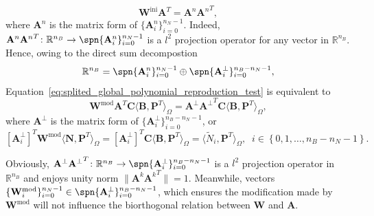 \begin{equation}
	\mathbf{W}^\text{ini}\mathbf{A}^T=\mathbf{A}^n{\mathbf{A}^n}^T,
\end{equation}
where $\mathbf{A}^n$ is the matrix form of $\{\mathbf{A}^n_i\}_{i=0}^{n_N-1}$. Indeed, $\mathbf{A}^n{\mathbf{A}^n}^T\colon\mathbb{R}^{n_B}\rightarrow\spn\{\mathbf{A}^n_i\}_{i=0}^{n_N-1}$ is a $l^2$ projection operator for any vector in $\mathbb{R}^{n_B}$. Hence, owing to the direct sum decompostion
\begin{equation}
	\mathbb{R}^{n_B}=\spn\{\mathbf{A}^n_i\}_{i=0}^{n_N-1}\oplus\spn\{\mathbf{A}^\perp_i\}_{i=0}^{n_B-n_N-1},
\end{equation}
Equation~\eqref{eq:splited_global_polynomial_reproduction_test} is equivalent to
\begin{equation}
	\mathbf{W}^\text{mod}\mathbf{A}^T\mathbf{C}\langle\mathbf{B},\mathbf{P}^T\rangle_\Omega=\mathbf{A}^\perp{\mathbf{A}^\perp}^T\mathbf{C}\langle\mathbf{B},\mathbf{P}^T\rangle_\Omega,
\end{equation}
where $\mathbf{A}^\perp$ is the matrix form of $\{\mathbf{A}^\perp_i\}_{i=0}^{n_B-n_N-1}$, or
\begin{equation}
	\left[\mathbf{A}^\perp_i\right]^T\mathbf{W}^\text{mod}\langle\mathbf{N},\mathbf{P}^T\rangle_\Omega = \left[\mathbf{A}^\perp_i\right]^T\mathbf{C}\langle\mathbf{B},\mathbf{P}^T\rangle_\Omega=\langle \tilde{N}_i,\mathbf{P}^T\rangle_\Omega,\;\; i\in\left\{0,1,\dots,n_B-n_N-1\right\}. \label{eq:final_global_polynomial_reproduction}
\end{equation}

\begin{remark}
	Obviously, $\mathbf{A}^\perp{\mathbf{A}^\perp}^T\colon\mathbb{R}^{n_B}\rightarrow\spn\{\mathbf{A}^\perp_i\}_{i=0}^{n_B-n_N-1}$ is a $l^2$ projection operator in $\mathbb{R}^{n_B}$ and enjoys unity norm $\|\mathbf{A}^k{\mathbf{A}^k}^T\|=1$. Meanwhile, vectors $\{\mathbf{W}_i^\text{mod}\}_{i=0}^{n_N-1}\in\spn\{\mathbf{A}^\perp_i\}_{i=0}^{n_B-n_N-1}$, which ensures the modification made by $\mathbf{W}^\text{mod}$ will not influence the biorthogonal relation between $\mathbf{W}$ and $\mathbf{A}$.
\end{remark}




